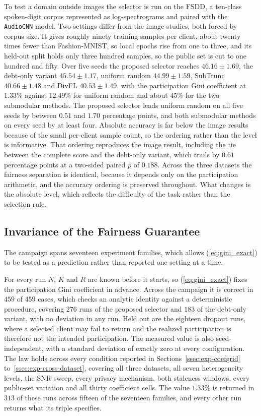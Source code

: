 \documentclass[journal]{IEEEtran}
\newcommand{\rev}[1]{#1}
\begin{document}
\rev{To test a domain outside images the selector is run on the FSDD, a ten-class spoken-digit corpus represented as log-spectrograms and paired with the \texttt{AudioCNN} model. Two settings differ from the image studies, both forced by corpus size. It gives roughly ninety training samples per client, about twenty times fewer than Fashion-MNIST, so local epochs rise from one to three, and its held-out split holds only three hundred samples, so the public set is cut to one hundred and fifty. Over five seeds the proposed selector reaches $46.16 \pm 1.69$, the debt-only variant $45.54 \pm 1.17$, uniform random $44.99 \pm 1.59$, SubTrunc $40.66 \pm 1.48$ and DivFL $40.53 \pm 1.49$, with the participation Gini coefficient at $1.33\%$ against $12.49\%$ for uniform random and about $45\%$ for the two submodular methods. The proposed selector leads uniform random on all five seeds by between $0.51$ and $1.70$ percentage points, and both submodular methods on every seed by at least four. Absolute accuracy is far below the image results because of the small per-client sample count, so the ordering rather than the level is informative. That ordering reproduces the image result, including the tie between the complete score and the debt-only variant, which trails by $0.61$ percentage points at a two-sided paired $p$ of $0.188$. Across the three datasets the fairness separation is identical, because it depends only on the participation arithmetic, and the accuracy ordering is preserved throughout. What changes is the absolute level, which reflects the difficulty of the task rather than the selection rule.}

\subsection{Invariance of the Fairness Guarantee}
\label{ssec:exp-invariance}

\rev{The campaign spans seventeen experiment families, which allows (\ref{eq:gini_exact}) to be tested as a prediction rather than reported one setting at a time.}

\rev{For every run $N$, $K$ and $R$ are known before it starts, so (\ref{eq:gini_exact}) fixes the participation Gini coefficient in advance. Across the campaign it is correct in $459$ of $459$ cases, which checks an analytic identity against a deterministic procedure, covering $276$ runs of the proposed selector and $183$ of the debt-only variant, with no deviation in any run. Held out are the eighteen dropout runs, where a selected client may fail to return and the realized participation is therefore not the intended participation. The measured value is also seed-independent, with a standard deviation of exactly zero at every configuration. The law holds across every condition reported in Sections~\ref{ssec:exp-coefgrid} to~\ref{ssec:exp-cross-dataset}, covering all three datasets, all seven heterogeneity levels, the SNR sweep, every privacy mechanism, both staleness windows, every public-set variation and all thirty coefficient cells. The value $1.33\%$ is returned in $313$ of these runs across fifteen of the seventeen families, and every other run returns what its triple specifies.}
\end{document}

